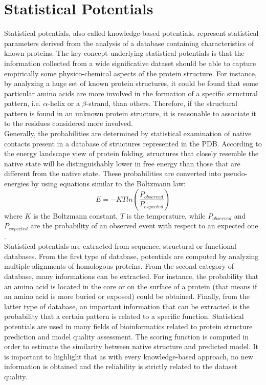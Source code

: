 \section{Statistical Potentials}
\label{sec:statistical_potentials}
Statistical potentials, also called knowledge-based potentials, represent statistical parameters derived from the analysis of a database containing characteristics of known proteins. The key concept underlying statistical potentials is that the information collected from a wide significative dataset should be able to capture empirically some physico-chemical aspects of the protein structure. For instance, by analyzing a huge set of known protein structures, it could be found that some particular amino acids are more involved in the formation of a specific structural pattern, i.e. $\alpha$-helix or a $\beta$-strand, than others. Therefore, if the structural pattern is found in an unknown protein structure, it is reasonable to associate it to the residues considered more involved.\\
Generally, the probabilities are determined by statistical examination of native contacts present in a database of structures represented in the PDB. According to the energy landscape view of protein folding, structures that closely resemble the native state will be distinguishably lower in free energy than those that are different from the native state. These probabilities are converted into pseudo-energies by using equations similar to the Boltzmann law:
\begin{equation}
 	E = -KT ln(\frac{P_{observed}}{P_{expected}})
\end{equation}
where $K$ is the Boltzmann constant, $T$ is the temperature, while $P_{observed}$ and $P_{expected}$ are the probability of an observed event with respect to an expected one \cite{Sippl1990aa, Sippl1996aa}.\\
Statistical potentials are extracted from sequence, structural or functional databases. From the first type of database, potentials are computed by analyzing multiple-alignments of homologous proteins. From the second category of database, many informations can be extracted. For instance, the probability that an amino acid is located in the core or on the surface of a protein (that means if an amino acid is more buried or exposed) could be obtained. Finally, from the latter type of database, an important information that can be extracted is the probability that a certain pattern is related to a specific function. Statistical potentials are used in many fields of bioinformatics related to protein structure prediction and model quality assessment. The scoring function is computed in order to estimate the similarity between native structure and predicted model. It is important to highlight that as with every knowledge-based approach, no new information is obtained and the reliability is strictly related to the dataset quality.


\cleardoublepage